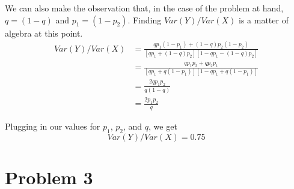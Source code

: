 \documentclass{article}
\begin{document}
We can also make the observation that, in the case of the problem at hand, $q =
(1-q)$ and $p_1 = (1 - p_2)$. Finding $Var(Y)/Var(X)$ is a matter of algebra at
this point.
\begin{align*}
  Var(Y)/Var(X) &= \frac{qp_1(1-p_1)+(1-q)p_2(1-p_2)}{[qp_1+(1-q)p_2]
[1-qp_1-(1-q)p_2]} \\
&= \frac{qp_1p_2 + qp_2p_1}{[qp_1+q(1-p_1)][1-qp_1+q(1-p_1)]} \\
&= \frac{2qp_1p_2}{q(1-q)} \\
&= \frac{2p_1p_2}{q}
\end{align*}

Plugging in our values for $p_1$, $p_2$, and $q$, we get
\begin{equation*}
  Var(Y)/Var(X) = 0.75
\end{equation*}

\section*{Problem 3}
\end{document}
